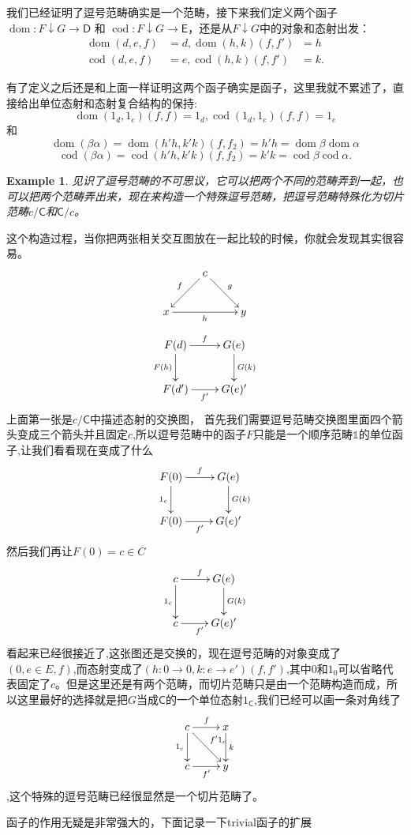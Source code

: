 \documentclass[UTF8,11pt,a4paper]{ctexart}
\newtheorem{example}[theorem]{Example}
\newcommand{\sC}{\mathsf{C}}
\newcommand{\sD}{\mathsf{D}}
\newcommand{\sE}{\mathsf{E}}
\newcommand{\al}{\alpha}
\newcommand{\be}{\beta}
\newcommand*{\xfunc}[4]{{#2}\colon{#3}{#1}{#4}}
\newcommand*{\func}[3]{\xfunc{\to}{#1}{#2}{#3}}
\newcommand*{\qty}[1]{\left({#1}\right)}
\DeclareMathOperator{\dom}{dom}
\DeclareMathOperator{\cod}{cod}
\begin{document}
我们已经证明了逗号范畴确实是一个范畴，接下来我们定义两个函子$\func{\dom}{F \downarrow G}{\sD}$ 和 $\func{\cod}{F \downarrow G}{\sE}$，还是从$F \downarrow G$中的对象和态射出发：
\begin{align*}
	\dom\qty{d,e,f} &= d, \dom\qty{h,k}\qty{f,f'} \;\;= h \\
	\cod\qty{d,e,f} &= e, \cod\qty{h,k}\qty{f,f'} \quad= k.
\end{align*}

有了定义之后还是和上面一样证明这两个函子确实是函子，这里我就不累述了，直接给出单位态射和态射复合结构的保持:\[\dom\qty{1_{d},1_{e}}\qty{f,f} = 1_d,\cod\qty{1_{d},1_{e}}\qty{f,f} =1_e \]和\[\dom(\be \al) = \dom\qty{h'  h,k'  k}\qty{f,f_2} =h'
	 h = \dom\be  \dom\al\] \[\cod(\be \al) = \cod \qty{h' h,k' k}\qty{f,f_2}=  k'
	 k = \cod\be\cod\al.\]
	 
\begin{example}
见识了逗号范畴的不可思议，它可以把两个不同的范畴弄到一起，也可以把两个范畴弄出来，现在来构造一个特殊逗号范畴，把逗号范畴特殊化为切片范畴$c/\sC$和$\sC/c$。
\end{example}

这个构造过程，当你把两张相关交互图放在一起比较的时候，你就会发现其实很容易。
\[ \xymatrix{&c\ar[dr]^g
		\ar[dl]_f& \\ x \ar[rr]_h && y } \] \[\xymatrix{
					F(d) \ar[d]_{F(h)} \ar[r]^{f} & G(e)\ar[d]^{G(k)}  \\
			F(d')\ar[r]_{f'} &G(e)'}\]上面第一张是$c/\sC$中描述态射的交换图，	 首先我们需要逗号范畴交换图里面四个箭头变成三个箭头并且固定$c$,所以逗号范畴中的函子$F$只能是一个顺序范畴$\mathbb{1}$的单位函子,让我们看看现在变成了什么\[\xymatrix{F(0) \ar[d]_{1_c} \ar[r]^{f} & G(e)\ar[d]^{G(k)}  \\F(0)\ar[r]_{f'} &G(e)'}\]然后我们再让$F(0)=c \in C$ \[\xymatrix{c \ar[d]_{1_c} \ar[r]^{f} & G(e)\ar[d]^{G(k)}  \\c\ar[r]_{f'} &G(e)'}\]看起来已经很接近了,这张图还是交换的，现在逗号范畴的对象变成了$\qty{0,e \in E,f}$,而态射变成了$\qty{\func{h}{0}{0},\func{k}{e}{e'}}(f,f')$,其中$0$和$1_0$可以省略代表固定了$c$。但是这里还是有两个范畴，而切片范畴只是由一个范畴构造而成，所以这里最好的选择就是把$G$当成$\sC$的一个单位态射$1_{\sC}$,我们已经可以画一条对角线了\[\xymatrix{c \ar[d]_{1_c} \ar[r]^{f} \ar[rd]^{f'1_c} & x\ar[d]^{k}  \\c\ar[r]_{f'} &y}\],这个特殊的逗号范畴已经很显然是一个切片范畴了。
			

函子的作用无疑是非常强大的，下面记录一下trivial函子的扩展
\end{document}
